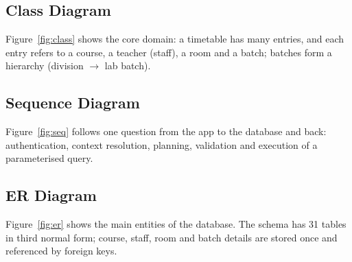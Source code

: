 \subsection{Class Diagram}
Figure~\ref{fig:class} shows the core domain: a timetable has many entries, and each entry refers to a
course, a teacher (staff), a room and a batch; batches form a hierarchy (division $\rightarrow$ lab
batch).


\subsection{Sequence Diagram}
Figure~\ref{fig:seq} follows one question from the app to the database and back: authentication,
context resolution, planning, validation and execution of a parameterised query.


\subsection{ER Diagram}
Figure~\ref{fig:er} shows the main entities of the database. The schema has 31 tables in third normal
form; course, staff, room and batch details are stored once and referenced by foreign keys.

\newpage
